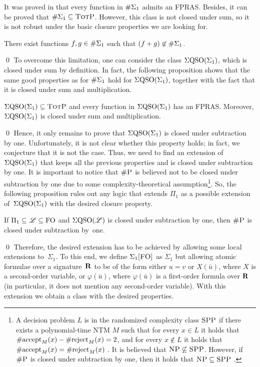 It was proved in \cite{SalujaST95} that every function in $\#\Sigma_{1}$ admits an FPRAS. Besides, it can be proved that $\#\Sigma_{1} \subseteq \text{\sc TotP}$. 
However, this class is not closed under sum, so it is not robust under the basic closure properties we are looking for. 
\begin{prop}\label{prop-e1-nc}
There exist functions $f, g \in \#\Sigma_{1}$ such that $(f + g) \not\in \#\Sigma_{1}$.
\end{prop}
\proof

\qed
To overcome this limitation, one can consider the class $\Sigma{\rm QSO}(\Sigma_{1})$, which is closed under sum by definition. In fact, the following proposition shows that the same good properties as for $\#\Sigma_{1}$ hold for $\Sigma{\rm QSO}(\Sigma_{1})$, together with the fact that it is closed under sum and multiplication.
\begin{prop} \label{prop:qe0-fp-qe1-totp-fptras}
$\Sigma{\rm QSO}(\Sigma_{1}) \subseteq \text{\sc TotP}$ and every function in $\Sigma{\rm QSO}(\Sigma_{1})$ has an FPRAS. Moreover, $\Sigma{\rm QSO}(\Sigma_{1})$ is closed under sum and multiplication.
\end{prop}
\proof

\qed
Hence, it only remains to prove that $\Sigma{\rm QSO}(\Sigma_{1})$ is closed under subtraction by one. Unfortunately, it is not clear whether this property holds; in fact, we conjecture that it is not the case. Thus, we need to find an extension of $\Sigma{\rm QSO}(\Sigma_{1})$ that keeps all the previous properties and is closed under subtraction by one. It is important to notice that $\text{\sc \#P}$ is believed not to be closed under subtraction by one due to some complexity-theoretical assumption\footnote{A decision problem $L$ is in the randomized complexity class $\text{\sc SPP}$ if there exists a polynomial-time NTM $M$ such that for every $x \in L$ it holds that $\text{\rm \#accept}_M(x) - \text{\rm \#reject}_M(x) = 2$, and for every $x \not\in L$ it holds that $\text{\rm \#accept}_M(x) = \text{\rm \#reject}_M(x)$ \cite{OH93,FFK94}. It is believed that $\text{\sc NP} \not\subseteq \text{\sc SPP}$.
However, if $\text{\sc \#P}$ is closed under subtraction by one, then it holds that $\text{\sc NP} \subseteq \text{\sc SPP}$ \cite{OH93}.}. So, the following proposition rules out any logic that extends $\Pi_1$ as a possible extension of~$\Sigma{\rm QSO}(\Sigma_{1})$ with the desired closure property.
\begin{prop} \label{pi-minusone}
If $\Pi_1 \subseteq \mathscr{L} \subseteq {\rm FO}$ and $\Sigma{\rm QSO}(\mathscr{L})$ is closed under subtraction by one, then $\text{\sc \#P}$ is closed under subtraction by~one. 
\end{prop}
\proof

\qed
Therefore, the desired extension has to be achieved by allowing some local extensions to~$\Sigma_1$. To this end, we define $\Sigma_{1}\textsc{[FO]}$ as $\Sigma_1$ but allowing atomic formulae over a signature~$\mathbf{R}$ to be of the form either $u = v$ or $X(\bar u)$, where $X$ is a second-order variable, or $\varphi(\bar u)$, where $\varphi(\bar u)$ is a first-order formula over $\mathbf{R}$ (in particular, it does not mention any second-order variable). With this extension we obtain a class with the desired properties.
